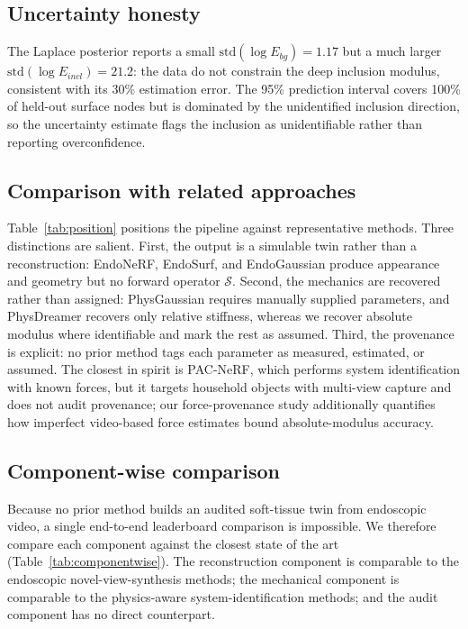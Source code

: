 \documentclass[review]{elsarticle}
\begin{document}
\subsection{Uncertainty honesty}
\label{sec:uq_exp}
The Laplace posterior reports a small $\mathrm{std}(\log E_{bg}) = 1.17$
but a much larger $\mathrm{std}(\log E_{incl}) = 21.2$: the data do not
constrain the deep inclusion modulus, consistent with its 30\% estimation
error. The 95\% prediction interval covers 100\% of held-out surface nodes
but is dominated by the unidentified inclusion direction, so the
uncertainty estimate flags the inclusion as unidentifiable rather than
reporting overconfidence.

\subsection{Comparison with related approaches}
\label{sec:comparison}
Table~\ref{tab:position} positions the pipeline against representative
methods. Three distinctions are salient. First, the output is a simulable
twin rather than a reconstruction: EndoNeRF, EndoSurf, and EndoGaussian
produce appearance and geometry but no forward operator $\mathcal{S}$.
Second, the mechanics are recovered rather than assigned: PhysGaussian
requires manually supplied parameters, and PhysDreamer recovers only
relative stiffness, whereas we recover absolute modulus where identifiable
and mark the rest as assumed. Third, the provenance is explicit: no prior
method tags each parameter as measured, estimated, or assumed. The closest
in spirit is PAC-NeRF, which performs system identification with known
forces, but it targets household objects with multi-view capture and does
not audit provenance; our force-provenance study additionally quantifies
how imperfect video-based force estimates bound absolute-modulus accuracy.

\subsection{Component-wise comparison}
\label{sec:componentwise}
Because no prior method builds an audited soft-tissue twin from endoscopic
video, a single end-to-end leaderboard comparison is impossible. We
therefore compare each component against the closest state of the art
(Table~\ref{tab:componentwise}). The reconstruction component is comparable
to the endoscopic novel-view-synthesis methods; the mechanical component is
comparable to the physics-aware system-identification methods; and the
audit component has no direct counterpart.
\end{document}
